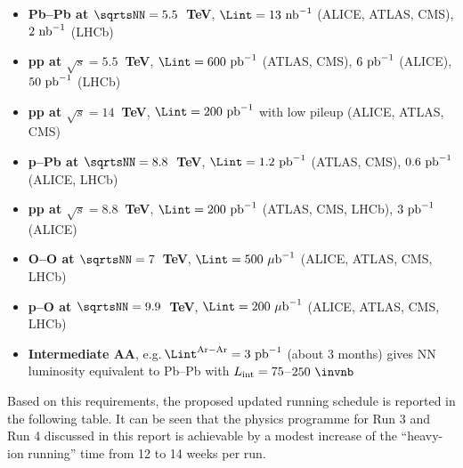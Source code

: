 \documentclass[../report.tex]{subfiles}
\begin{document}
\begin{itemize}

\item {\bf Pb--Pb at $\sqrtsNN=5.5$~TeV}, $\Lint=13~{\rm nb}^{-1}$ (ALICE, ATLAS, CMS), $2~{\rm nb}^{-1}$ (LHCb)

\item {\bf pp at $\sqrt s=5.5$~TeV}, $\Lint=600~{\rm pb}^{-1}$ (ATLAS, CMS), $6~{\rm pb}^{-1}$ (ALICE),  $50~{\rm pb}^{-1}$ (LHCb) 

\item {\bf pp at $\sqrt s=14$~TeV}, $\Lint=200~{\rm pb}^{-1}$ with low pileup (ALICE, ATLAS, CMS)

\item {\bf p--Pb at $\sqrtsNN=8.8$~TeV}, $\Lint=1.2~{\rm pb}^{-1}$ (ATLAS, CMS), $0.6~{\rm pb}^{-1}$ (ALICE, LHCb) 

\item {\bf pp at $\sqrt s=8.8$~TeV}, $\Lint=200~{\rm pb}^{-1}$ (ATLAS, CMS, LHCb), $3~{\rm pb}^{-1}$ (ALICE)

\item {\bf O--O at $\sqrtsNN=7$~TeV}, $\Lint=500~{\rm \mu b}^{-1}$ (ALICE, ATLAS, CMS, LHCb)

\item {\bf p--O at $\sqrtsNN=9.9$~TeV}, $\Lint=200~{\rm \mu b}^{-1}$ (ALICE, ATLAS, CMS, LHCb)

\item {\bf Intermediate AA}, e.g.\,$\Lint^{\rm Ar-Ar}=3~{\rm pb}^{-1}$ (about 3 months) gives NN luminosity equivalent to Pb--Pb with $L_{\rm int} =75$--$250~\invnb$

\end{itemize}

Based on this requirements, the proposed updated running schedule is reported in the following table. It can be seen that the physics programme for Run 3 and Run 4 discussed in this report is achievable by a modest increase of the ``heavy-ion running'' time from 12 to 14 weeks per run.
\end{document}
